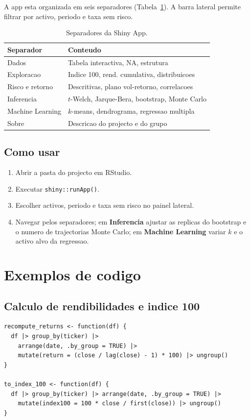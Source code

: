 \documentclass[11pt,a4paper]{article}
\begin{document}
A app esta organizada em seis separadores (Tabela~\ref{tab:tabs}). A
barra lateral permite filtrar por activo, periodo e taxa sem risco.

\begin{table}[H]\centering
\caption{Separadores da Shiny App.}\label{tab:tabs}
\begin{tabular}{ll}
\toprule
\textbf{Separador} & \textbf{Conteudo} \\ \midrule
Dados             & Tabela interactiva, NA, estrutura \\
Exploracao        & Indice 100, rend. cumulativa, distribuicoes \\
Risco e retorno   & Descritivas, plano vol-retorno, correlacoes \\
Inferencia        & $t$-Welch, Jarque-Bera, bootstrap, Monte Carlo \\
Machine Learning  & $k$-means, dendrograma, regressao multipla \\
Sobre             & Descricao do projecto e do grupo \\
\bottomrule
\end{tabular}
\end{table}

\subsection{Como usar}
\begin{enumerate}[leftmargin=*]
  \item Abrir a pasta do projecto em RStudio.
  \item Executar \texttt{shiny::runApp()}.
  \item Escolher activos, periodo e taxa sem risco no painel lateral.
  \item Navegar pelos separadores; em \textbf{Inferencia} ajustar as
        replicas do bootstrap e o numero de trajectorias Monte Carlo;
        em \textbf{Machine Learning} variar $k$ e o activo alvo da
        regressao.
\end{enumerate}

\section{Exemplos de codigo}

\subsection{Calculo de rendibilidades e indice 100}
\begin{lstlisting}[caption={Indice base 100 e rendibilidades simples.}]
recompute_returns <- function(df) {
  df |> group_by(ticker) |>
    arrange(date, .by_group = TRUE) |>
    mutate(return = (close / lag(close) - 1) * 100) |> ungroup()
}

to_index_100 <- function(df) {
  df |> group_by(ticker) |> arrange(date, .by_group = TRUE) |>
    mutate(index100 = 100 * close / first(close)) |> ungroup()
}
\end{lstlisting}
\end{document}
